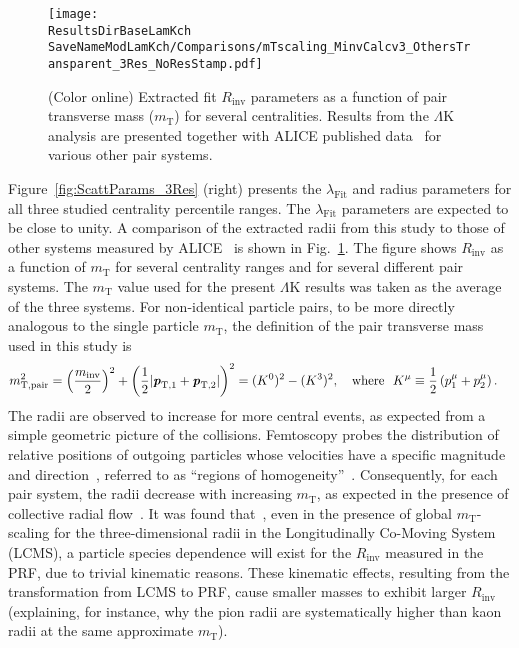 \documentclass[ALICE,manyauthors]{cernphprep}
\newcommand{\ResultsDirBaseLamKch}{/home/jesse/Analysis/FemtoAnalysis/Results/Results_cLamcKch_20190319/}
\newcommand{\MomRes}{_MomResCrctn}%
\newcommand{\NonFlatBgdLamKch}{_NonFlatBgdCrctnLamK0LamKchPolynomial}
\newcommand{\ResNum}{_3Res}
\newcommand{\PrimMaxDecay}{_PrimMaxDecay10fm}
\newcommand{\ResMethod}{_UsingXiDataAndCoulombOnly}
\newcommand{\ParamFixAndShareLamKch}{_ShareLam_Dualie_ShareLam_ShareRadii}
\newcommand{\SaveNameModLamKch}{\MomRes\NonFlatBgdLamKch\ResNum\PrimMaxDecay\ResMethod\ParamFixAndShareLamKch}
\newcommand{\mt}{$m_{\mathrm{T}}$\xspace}
\newcommand{\LamK}{$\Lambda$K\xspace}
\begin{document}
\begin{figure}[h]
  \centering
  \texttt{[image: \\ResultsDirBaseLamKch\\SaveNameModLamKch/Comparisons/mTscaling\_MinvCalcv3\_OthersTransparent\_3Res\_NoResStamp.pdf]}
  \caption[\mt Scaling of Radii: 3 Residuals in Fit]
  {
  (Color online) Extracted fit $R_{\mathrm{inv}}$ parameters as a function of pair transverse mass (\mt) for several centralities.
  Results from the \LamK analysis are presented together with ALICE published data~\cite{Adam:2015vja} for various other pair systems.  
  }
  \label{fig:mTScalingOfRadii_3Res}
\end{figure}

Figure~\ref{fig:ScattParams_3Res} (right) presents the $\lambda_{\mathrm{Fit}}$ and radius parameters for all three studied centrality percentile ranges.
The $\lambda_{\mathrm{Fit}}$ parameters are expected to be close to unity. 
A comparison of the extracted radii from this study to those of other systems measured by ALICE~\cite{Adam:2015vja} is shown in Fig.~\ref{fig:mTScalingOfRadii_3Res}. 
The figure shows $R_{\mathrm{inv}}$ as a function of \mt for several centrality ranges and for several different pair systems.
The \mt value used for the present \LamK results was taken as the average of the three systems.
For non-identical particle pairs, to be more directly analogous to the single particle \mt, the definition of the pair transverse mass used in this study is
\begin{equation}
\begin{aligned}
 m_{\mathrm{T, pair}}^{2} &= \left( \frac{m_{\mathrm{inv}}}{2} \right)^{2} + \left( \frac{1}{2} |\textbf{\textit{p}}_{\mathrm{T,1}} + \textbf{\textit{p}}_{\mathrm{T,2}}| \right)^{2} = (K^{0})^{2} - (K^{3})^{2}, \quad \mathrm{where} ~~K^{\mu} \equiv \frac{1}{2} \left( p_{1}^{\mu} + p_{2}^{\mu} \right).
\end{aligned}
\label{eqn:PairmTv1}
\end{equation}
The radii are observed to increase for more central events, as expected from a simple geometric picture of the collisions.
Femtoscopy probes the distribution of relative positions of outgoing particles whose velocities have a specific magnitude and direction~\cite{Lisa:2005dd}, referred to as ``regions of homogeneity''~\cite{Akkelin:1995gh}.
Consequently, for each pair system, the radii decrease with increasing \mt, as expected in the presence of collective radial flow~\cite{Akkelin:1995gh}.
It was found that~\cite{Kisiel:2014upa}, even in the presence of global \mt-scaling for the three-dimensional radii in the Longitudinally Co-Moving System (LCMS), a particle species dependence will exist for the $R_{\mathrm{inv}}$ measured in the PRF, due to trivial kinematic reasons.
These kinematic effects, resulting from the transformation from LCMS to PRF, cause smaller masses to exhibit larger $R_{\mathrm{inv}}$~\cite{Adam:2015vja} (explaining, for instance, why the pion radii are systematically higher than kaon radii at the same approximate \mt).
\end{document}
